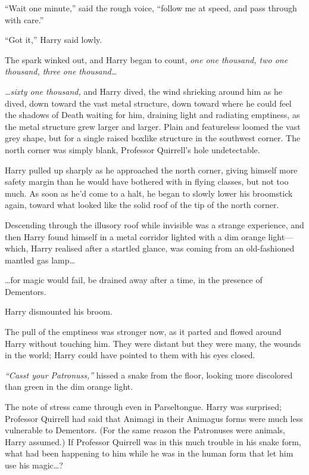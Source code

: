 ``Wait one minute,'' said the rough voice, ``follow me at speed, and
pass through with care.''

``Got it,'' Harry said lowly.

The spark winked out, and Harry began to count, \emph{one one thousand,
two one thousand, three one thousand\ldots{}}

\emph{\ldots{}sixty one thousand,} and Harry dived, the wind shrieking
around him as he dived, down toward the vast metal structure, down
toward where he could feel the shadows of Death waiting for him,
draining light and radiating emptiness, as the metal structure grew
larger and larger. Plain and featureless loomed the vast grey shape, but
for a single raised boxlike structure in the southwest corner. The north
corner was simply blank, Professor Quirrell's hole undetectable.

Harry pulled up sharply as he approached the north corner, giving
himself more safety margin than he would have bothered with in flying
classes, but not too much. As soon as he'd come to a halt, he began to
slowly lower his broomstick again, toward what looked like the solid
roof of the tip of the north corner.

Descending through the illusory roof while invisible was a strange
experience, and then Harry found himself in a metal corridor lighted
with a dim orange light---which, Harry realised after a startled glance,
was coming from an old-fashioned mantled gas lamp\ldots{}

\ldots{}for magic would fail, be drained away after a time, in the
presence of Dementors.

Harry dismounted his broom.

The pull of the emptiness was stronger now, as it parted and flowed
around Harry without touching him. They were distant but they were many,
the wounds in the world; Harry could have pointed to them with his eyes
closed.

\emph{``Casst your Patronuss,''} hissed a snake from the floor, looking
more discolored than green in the dim orange light.

The note of stress came through even in Parseltongue. Harry was
surprised; Professor Quirrell had said that Animagi in their Animagus
forms were much less vulnerable to Dementors. (For the same reason the
Patronuses were animals, Harry assumed.) If Professor Quirrell was in
this much trouble in his snake form, what had been happening to him
while he was in the human form that let him use his magic\ldots{}?

